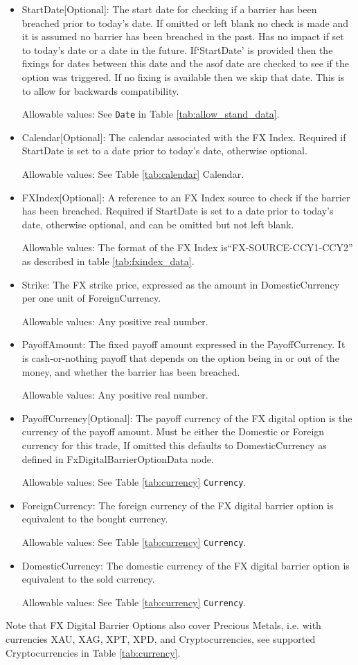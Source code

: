 \begin{itemize}
\item StartDate[Optional]: The start date for checking if a barrier has been breached prior to today's date.  If omitted or left blank no check is made and it is assumed no barrier has been breached in the past. Has no impact if set to today's date or a date in the future. If`StartDate' is provided then the fixings for dates between this date and the asof date are checked to see if the option was triggered. If no fixing is available then we skip that date. This is to allow for backwards compatibility.

Allowable values:  See \lstinline!Date! in Table \ref{tab:allow_stand_data}.

\item Calendar[Optional]: The calendar associated with the FX Index. Required if StartDate is set to a date prior to today's date, otherwise optional.

Allowable values: See Table \ref{tab:calendar} Calendar.

\item FXIndex[Optional]: A reference to an FX Index source to check if the barrier has been breached. Required if StartDate is set to a date prior to today's date, otherwise optional, and can be omitted but not left blank.

Allowable values:  The format of the FX Index is``FX-SOURCE-CCY1-CCY2'' as described in table \ref{tab:fxindex_data}.  

\item Strike: The FX strike price, expressed as the amount in DomesticCurrency per one unit of ForeignCurrency. 

Allowable values:  Any positive real number.

\item PayoffAmount: The fixed payoff amount expressed in the PayoffCurrency. It is cash-or-nothing payoff that depends on the option being in or out of the money, and whether the barrier has been breached.

Allowable values:  Any positive real number.

\item PayoffCurrency[Optional]: The payoff currency of the FX digital option is the currency of the payoff amount. Must be either the Domestic or Foreign currency for this trade, If omitted this defaults to DomesticCurrency as defined in FxDigitalBarrierOptionData node.

Allowable values:  See Table \ref{tab:currency} \lstinline!Currency!.

\item ForeignCurrency: The foreign currency of the FX digital barrier option is equivalent to the bought currency.  

Allowable values:  See Table \ref{tab:currency} \lstinline!Currency!.

\item DomesticCurrency: The domestic currency of the FX digital barrier option is equivalent to the sold currency. 

Allowable values:  See Table \ref{tab:currency} \lstinline!Currency!.

\end{itemize}

Note that FX Digital Barrier Options also cover Precious Metals, i.e. with
currencies XAU, XAG, XPT, XPD, and Cryptocurrencies,  see supported Cryptocurrencies in Table \ref{tab:currency}.
